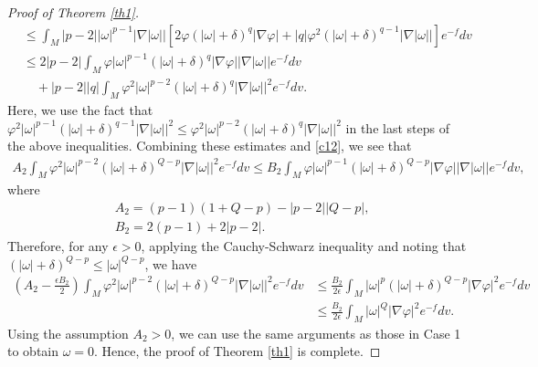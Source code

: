 \documentclass[10pt,a4paper]{amsart}
\numberwithin{equation}{section}
\begin{document}
\begin{proof}[Proof of Theorem \ref{th1}]
\begin{align}
		&\le  \int_M |p-2||\omega|^{p-1} |\nabla |\omega|| \left[ 2\varphi (|\omega|+\delta)^q |\nabla \varphi|+|q| \varphi^2 (|\omega|+\delta)^{q-1} |\nabla |\omega||  \right] e^{-f} dv\\\nonumber
		&\le 2|p-2| \int_M \varphi |\omega|^{p-1} (|\omega|+\delta)^{q}  |\nabla \varphi||\nabla|\omega||e^{-f}dv\\
		& \quad + |p-2||q| \int_M  \varphi^2 |\omega|^{p-2} (|\omega|+\delta)^{q} |\nabla|\omega||^2 e^{-f}dv.
	\end{align}
	Here, we use the fact that $\varphi^2 |\omega|^{p-1} (|\omega|+\delta)^{q-1} |\nabla|\omega||^2\le \varphi^2 |\omega|^{p-2} (|\omega|+\delta)^{q} |\nabla|\omega||^2$ in the last steps of the above inequalities. Combining these estimates and \eqref{c12}, we see that
	\begin{align}\nonumber
		A_2 \int_M \varphi^2 |\omega|^{p-2} (|\omega|+\delta)^{Q-p}|\nabla|\omega||^2 e^{-f}dv \le B_2 \int_M \varphi |\omega|^{p-1} (|\omega|+\delta)^{Q-p}|\nabla \varphi||\nabla|\omega||e^{-f}dv,
	\end{align}
	where
	\begin{align*}
		&A_2=(p-1)(1+Q-p)-|p-2||Q-p|,\\
		&B_2=2(p-1)+2|p-2|.
	\end{align*}
	Therefore, for any $\epsilon>0$, applying the Cauchy-Schwarz inequality and noting that $(|\omega|+\delta)^{Q-p}\le |\omega|^{Q-p}$, we have
	\begin{align}\nonumber
		\left(A_2-\frac{\epsilon B_2}{2}\right) \int_M \varphi^2 |\omega|^{p-2}(|\omega|+\delta)^{Q-p}|\nabla|\omega||^2 e^{-f}dv &\le \frac{B_2}{2\epsilon} \int_M |\omega|^{p} (|\omega|+\delta)^{Q-p}|\nabla \varphi|^2e^{-f}dv\\ \nonumber
				&\le \frac{B_2}{2\epsilon} \int_M |\omega|^{Q} |\nabla \varphi|^2e^{-f}dv.
	\end{align}
Using the assumption $A_2>0$, we can use the same arguments as those in Case 1 to obtain $\omega=0$. Hence, the proof of Theorem \ref{th1} is complete.	
\end{proof}
\end{document}
